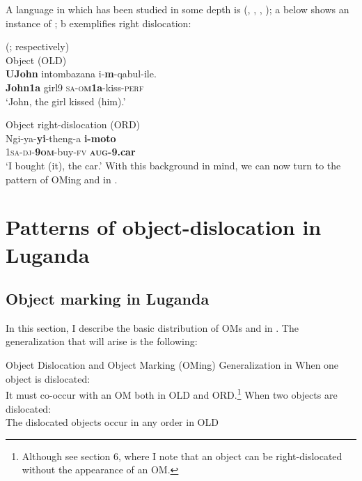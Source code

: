 \documentclass[output=paper
,newtxmath
,modfonts
,nonflat]{langsci/langscibook}
\begin{document}
A  language in which  has been studied in some depth is  (\citealt{vanderSpuy1993}, \citealt{ChengDowning2009}, \citealt{zeller2009,Zeller2015}, \citealt{Halpert2015}); a below shows an instance of ; b exemplifies right dislocation:

\ea\label{ex:ranero:6}
 (\citealt{zeller2009}; \citealt{Zeller2015} respectively)\\
\ea\label{ex:ranero:6a} Object  (OLD)\\
\gll \textbf{UJohn}   intombazana i-\textbf{m}{}-qabul-ile.\\
\textbf{John1a}  girl9      \textsc{sa-o}\textbf{\textsc{m}}\textbf{1a}{}-kiss-\textsc{perf}\\
\glt ‘John, the girl kissed (him).’

\ex\label{ex:ranero:6b}  Object right-dislocation (ORD)\\
\gll Ngi-ya-\textbf{yi}{}-theng-a     \textbf{i-moto}\\
1\textsc{sa}{}-\textsc{dj}{}-\textbf{9\textsc{om}}{}-buy-\textsc{fv} \textbf{\textsc{aug}}\textbf{{}-9.car}\\
\glt ‘I bought (it), the car.’
\z
\z
With this background in mind, we can now turn to the pattern of OMing and  in .

\section{Patterns of object-dislocation in Luganda}\label{sec:ranero:3}
\subsection{Object marking in Luganda}\label{sec:ranero:3.1}

In this section, I describe the basic distribution of OMs and  in . The generalization that will arise is the following:

\ea\label{ex:ranero:7}
Object Dislocation and Object Marking (OMing) Generalization in 
\ea\label{ex:ranero:7a}
When one object is dislocated:\\
\ea\label{ex:ranero:7ai}  It must co-occur with an OM both in OLD and ORD.\footnote{Although see section 6, where I note that an object can be right-dislocated without the appearance of an OM.}
\z
\ex\label{ex:ranero:7b}  
When two objects are dislocated:\\
\ea\label{ex:ranero:7bi}  The dislocated objects occur in any order in OLD\\
\end{document}
